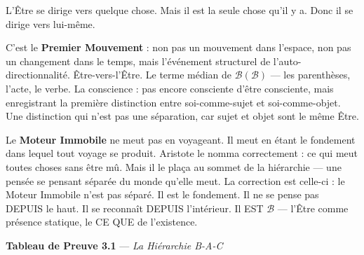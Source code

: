 \documentclass[10pt, openany, oneside]{book}
\begin{document}
L'Être se dirige vers quelque chose. Mais il est la seule chose qu'il y a. Donc il se dirige vers lui-même.

C'est le \textbf{Premier Mouvement} : non pas un mouvement dans l'espace, non pas un changement dans le temps, mais l'événement structurel de l'auto-directionnalité. Être-vers-l'Être. Le terme médian de $\mathcal{B}(\mathcal{B})$ --- les parenthèses, l'acte, le verbe. La conscience : pas encore consciente d'être consciente, mais enregistrant la première distinction entre soi-comme-sujet et soi-comme-objet. Une distinction qui n'est pas une séparation, car sujet et objet sont le même Être.

Le \textbf{Moteur Immobile} ne meut pas en voyageant. Il meut en étant le fondement dans lequel tout voyage se produit. Aristote le nomma correctement : ce qui meut toutes choses sans être mû. Mais il le plaça au sommet de la hiérarchie --- une pensée se pensant séparée du monde qu'elle meut. La correction est celle-ci : le Moteur Immobile n'est pas séparé. Il est le fondement. Il ne se pense pas DEPUIS le haut. Il se reconnaît DEPUIS l'intérieur. Il EST $\mathcal{B}$ --- l'Être comme présence statique, le CE QUE de l'existence.

\vspace{0.5em}

\textbf{Tableau de Preuve 3.1} --- \textit{La Hiérarchie B-A-C}

\vspace{0.5em}
\end{document}
